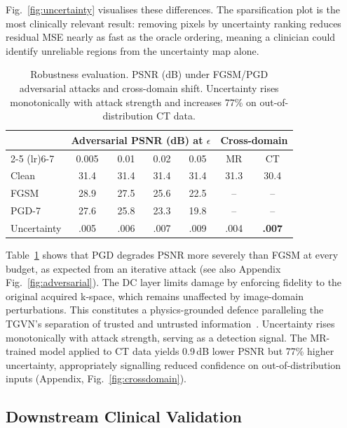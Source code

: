 \documentclass[runningheads]{llncs}
\begin{document}
Fig.~\ref{fig:uncertainty} visualises these differences. The sparsification plot is the most clinically relevant result: removing pixels by uncertainty ranking reduces residual MSE nearly as fast as the oracle ordering, meaning a clinician could identify unreliable regions from the uncertainty map alone.

\begin{table}[t]
\caption{Robustness evaluation. PSNR (dB) under FGSM/PGD adversarial attacks and cross-domain shift. Uncertainty rises monotonically with attack strength and increases 77\% on out-of-distribution CT data.}\label{tab:robust}
\centering\footnotesize
\setlength{\tabcolsep}{5pt}
\begin{tabular}{l cccc cc}
\toprule
& \multicolumn{4}{c}{Adversarial PSNR (dB) at $\epsilon$} & \multicolumn{2}{c}{Cross-domain} \\
\cmidrule(lr){2-5} \cmidrule(lr){6-7}
 & 0.005 & 0.01 & 0.02 & 0.05 & MR & CT \\
\midrule
Clean       & 31.4 & 31.4 & 31.4 & 31.4 & 31.3 & 30.4 \\
FGSM        & 28.9 & 27.5 & 25.6 & 22.5 & --   & --   \\
PGD-7       & 27.6 & 25.8 & 23.3 & 19.8 & --   & --   \\
\addlinespace
Uncertainty & .005 & .006 & .007 & .009 & .004 & \textbf{.007} \\
\bottomrule
\end{tabular}
\end{table}

Table~\ref{tab:robust} shows that PGD degrades PSNR more severely than FGSM at every budget, as expected from an iterative attack (see also Appendix Fig.~\ref{fig:adversarial}). The DC layer limits damage by enforcing fidelity to the original acquired k-space, which remains unaffected by image-domain perturbations. This constitutes a physics-grounded defence paralleling the TGVN's separation of trusted and untrusted information~\cite{atalik2026tgvn}. Uncertainty rises monotonically with attack strength, serving as a detection signal. The MR-trained model applied to CT data yields 0.9\,dB lower PSNR but 77\% higher uncertainty, appropriately signalling reduced confidence on out-of-distribution inputs (Appendix, Fig.~\ref{fig:crossdomain}).

\subsection{Downstream Clinical Validation}
\end{document}
